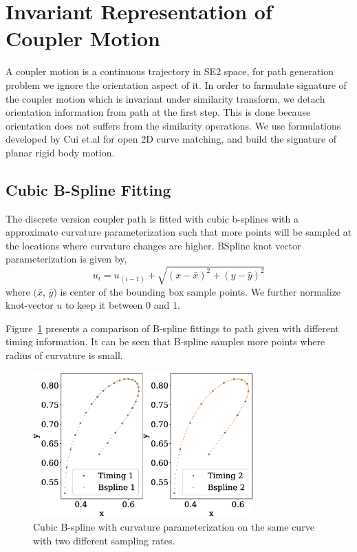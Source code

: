 \documentclass[twocolumn,10pt]{asme2ej}
\begin{document}
\section{Invariant Representation of Coupler Motion}
A coupler motion is a continuous trajectory in SE2 space, for path generation problem we ignore the orientation aspect of it.
In order to farmulate signature of the coupler motion which is invariant under similarity transform, we detach orientation information from path at the first step.
This is done because orientation does not suffers from the similarity operations.
We use formulations developed by Cui et.al\cite{cui2009} for open 2D curve matching, and build the signature of planar rigid body motion.

\subsection{Cubic B-Spline Fitting}
The discrete version coupler path is fitted with cubic b-splines with a approximate curvature parameterization such that more points will be sampled at the locations where curvature changes are higher. BSpline knot vector parameterization is given by,
\begin{equation}\label{u_1}
  u_i = u_{(i-1)} + \sqrt{{(x-\bar{x})}^2 + {(y-\bar{y})}^2}
\end{equation}
 where $(\bar{x}$, $\bar{y})$ is center of the bounding box sample points. We further normalize knot-vector $u$ to keep it between 0 and 1.

Figure~\ref{bsplineFitting} presents a comparison of B-spline fittings to path given with different timing information. It can be seen that B-spline samples more points where radius of curvature is small.

\begin{figure}
\centering
\includegraphics[width=240pt]{figure/fig_bspline.eps}
\caption{Cubic B-spline with curvature parameterization on the same curve with two different sampling rates.}
\label{bsplineFitting}
\end{figure}
\end{document}
